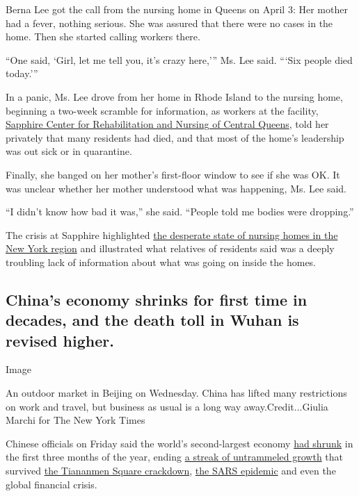 Berna Lee got the call from the nursing home in Queens on April 3: Her
mother had a fever, nothing serious. She was assured that there were no
cases in the home. Then she started calling workers there.

``One said, `Girl, let me tell you, it's crazy here,''' Ms. Lee said.
```Six people died today.'''

In a panic, Ms. Lee drove from her home in Rhode Island to the nursing
home, beginning a two-week scramble for information, as workers at the
facility, \href{https://www.sapphirerehab.com/}{Sapphire Center for
Rehabilitation and Nursing of Central Queens}, told her privately that
many residents had died, and that most of the home's leadership was out
sick or in quarantine.

Finally, she banged on her mother's first-floor window to see if she was
OK. It was unclear whether her mother understood what was happening, Ms.
Lee said.

``I didn't know how bad it was,'' she said. ``People told me bodies were
dropping.''

The crisis at Sapphire highlighted
\href{https://www.nytimes3xbfgragh.onion/2020/04/11/nyregion/nursing-homes-deaths-coronavirus.html}{the
desperate state of nursing homes in the New York region} and illustrated
what relatives of residents said was a deeply troubling lack of
information about what was going on inside the homes.

\hypertarget{chinas-economy-shrinks-for-first-time-in-decades-and-the-death-toll-in-wuhan-is-revised-higher}{%
\subsection{China's economy shrinks for first time in decades, and the
death toll in Wuhan is revised
higher.}\label{chinas-economy-shrinks-for-first-time-in-decades-and-the-death-toll-in-wuhan-is-revised-higher}}

Image

An outdoor market in Beijing on Wednesday. China has lifted many
restrictions on work and travel, but business as usual is a long way
away.Credit...Giulia Marchi for The New York Times

Chinese officials on Friday said the world's second-largest economy
\href{https://www.nytimes3xbfgragh.onion/2020/04/16/business/china-coronavirus-economy.html}{had
shrunk} in the first three months of the year, ending
\href{https://www.nytimes3xbfgragh.onion/interactive/2018/11/25/world/asia/china-economy-strategy.html}{a
streak of untrammeled growth} that survived
\href{https://www.nytimes3xbfgragh.onion/2019/05/30/world/asia/china-tiananmen-crackdown.html}{the
Tiananmen Square crackdown},
\href{https://www.nytimes3xbfgragh.onion/2020/02/03/business/economy/SARS-coronavirus-economic-impact-china.html}{the
SARS epidemic} and even the global financial crisis.

